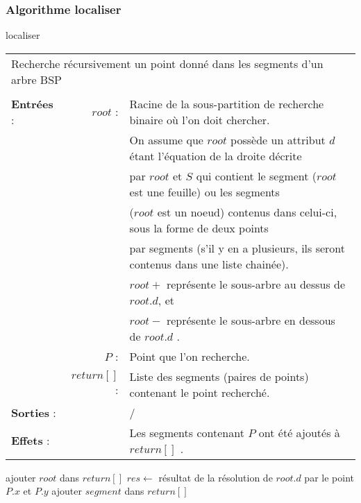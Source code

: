 \documentclass[10pt]{article}
\begin{document}
\subsubsection{Algorithme localiser}
\begin{algorithm}[H]
\caption{localiser}
\begin{tabular}{lrl}
\multicolumn{3}{l}{Recherche récursivement un point donné dans les segments d'un arbre BSP}\\
&&\\
\textbf{Entrées} : &$root$ : &Racine de la sous-partition de recherche binaire où l'on doit chercher.\\
&&On assume que $root$ possède un attribut $d$ étant l'équation de la droite décrite\\
&&par $root$ et $S$ qui contient le segment ($root$ est une feuille) ou les segments\\
&&($root$ est un noeud) contenus dans celui-ci, sous la forme de deux points\\
&& par segments (s'il y en a plusieurs, ils seront contenus dans une liste chainée).\\
&&$root+$ représente le sous-arbre au dessus de $root.d$, et\\
&&$root-$ représente le sous-arbre en dessous de $root.d$ .\\
&$P$ :&Point que l'on recherche.\\
&$return[]$ :&Liste des segments (paires de points) contenant le point recherché.\\
\textbf{Sorties} :& &/\\
\textbf{Effets} :& &Les segments contenant $P$ ont été ajoutés à $return[]$ .
\end{tabular}
\begin{algorithmic}[1]
\State ajouter $root$ dans $return[]$
\EndIf
\Else
\State $res\gets$ résultat de la résolution de $root.d$ par le point $P.x$ et $P.y$
\State {}
\State {}
\Else
{}
\State ajouter $segment$ dans $return[]$
\EndIf
\EndFor
\State{}
\State{}
\EndIf
\EndIf
\EndProcedure
\end{algorithmic}
\end{algorithm}
\end{document}
